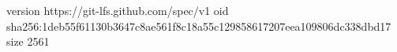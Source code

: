 version https://git-lfs.github.com/spec/v1
oid sha256:1deb55f61130b3647c8ae561f8c18a55c129858617207eea109806dc338dbd17
size 2561
